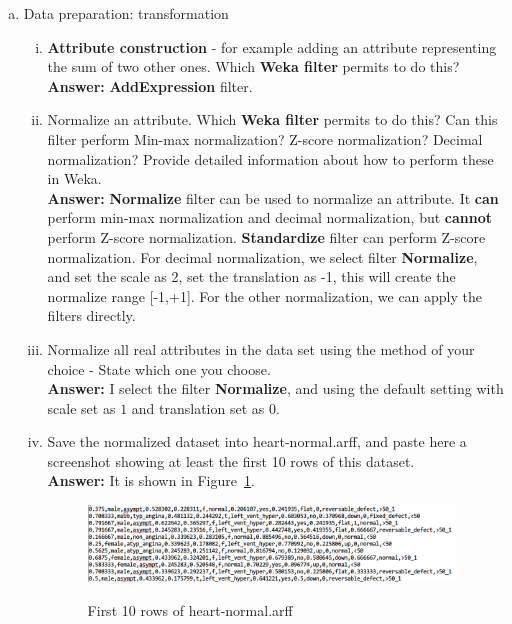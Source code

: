 \documentclass[11pt, final]{article}
\begin{document}
\begin{enumerate}[(a)]
\item Data preparation: transformation
\begin{enumerate}[(i)]
\item \textbf{Attribute construction} - for example adding an attribute representing the sum of two other ones. Which \textbf{Weka filter} permits to do this?\\

\textbf{Answer:} \textbf{AddExpression} filter.
\item Normalize an attribute. Which \textbf{Weka filter} permits to do this? Can this filter perform Min-max normalization? Z-score normalization? Decimal normalization? Provide detailed information about how to perform these in Weka. \\

\textbf{Answer: } \textbf{Normalize} filter can be used to normalize an attribute. It \textbf{can} perform min-max normalization and decimal normalization, but \textbf{cannot} perform Z-score normalization. 
\textbf{Standardize} filter can perform Z-score normalization. For decimal normalization, we select filter \textbf{Normalize}, and set the scale as 2, set the translation as -1, this will create the normalize range [-1,+1]. For the other normalization, we can apply the filters directly.
 
\item Normalize all real attributes in the data set using the method of your choice - State which one you choose. \\

\textbf{Answer: } I select the filter \textbf{Normalize}, and using the default setting with scale set as $1$ and translation set as $0$.
\item Save the normalized dataset into heart-normal.arff, and paste here a screenshot showing at least the first 10 rows of this dataset. \\

\textbf{Answer: } It is shown in Figure~\ref{fig: normal}.
\begin{figure}[!ht]
  \caption{First 10 rows of heart-normal.arff}
  \centering
   \includegraphics[width=0.98\textwidth]{normal-real.PNG}
   \label{fig: normal}
\end{figure}




\end{enumerate}
\end{enumerate}
\end{document}
